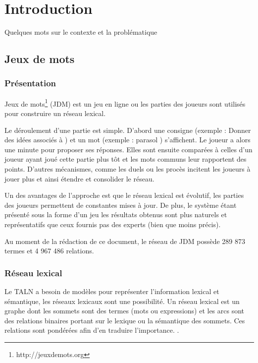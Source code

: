 \chapter{Introduction}

\begin{todo}
	Quelques mots sur le contexte et la problématique
\end{todo}

\section{Jeux de mots}

\subsection{Présentation}

Jeux de mots\footnote{http://jeuxdemots.org} (JDM) est un jeu en
ligne ou les parties des joueurs sont utilisés pour construire un réseau
lexical.

Le déroulement d'une partie est simple.
D'abord une consigne (exemple : \og Donner des idées associés à \fg) et un mot
(exemple : \og parasol \fg) s'affichent.
Le joueur a alors une minute pour proposer ses réponses.
Elles sont ensuite comparées à celles d'un joueur ayant joué cette partie
plus tôt et les mots communs leur rapportent des points.
D'autres mécanismes, comme les \og duels \fg ou les \og procès \fg
incitent les joueurs à jouer plus et ainsi étendre et consolider le réseau.

Un des avantages de l'approche est que le réseau lexical est évolutif, les
parties des joueurs permettent de constantes mises à jour.
De plus, le système étant présenté sous la forme d'un jeu les résultats
obtenus sont plus naturels et représentatifs que ceux fournis pas des 
experts (bien que moins précis).

Au moment de la rédaction de ce document, le réseau de JDM possède 289 873
termes et 4 967 486 relations.

\subsection{Réseau lexical}

Le TALN a besoin de modèles pour représenter l'information lexical et
sémantique, les réseaux lexicaux sont une possibilité.
Un réseau lexical est un graphe dont les sommets sont des termes (mots ou 
expressions) et les arcs sont des relations binaires portant sur le 
lexique ou la sémantique des sommets.
Ces relations sont pondérées afin d'en traduire l'importance.
\citep{lafourcade_tel-00649851}.


